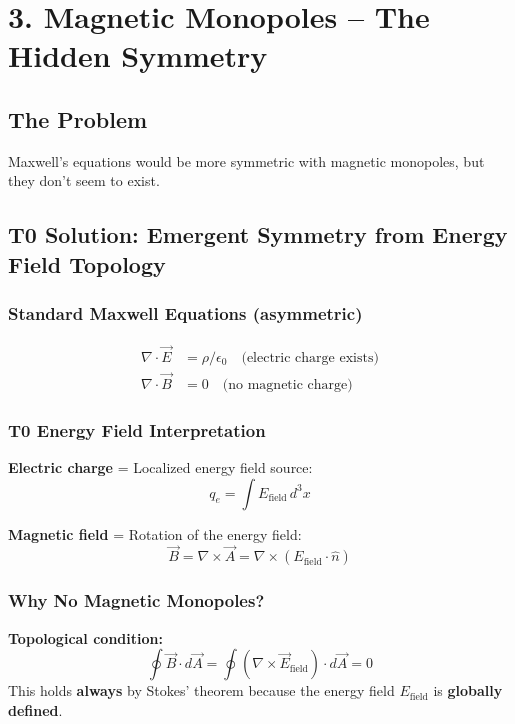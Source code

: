 	\section*{3. Magnetic Monopoles – The Hidden Symmetry}
	
	\subsection*{The Problem}
	Maxwell's equations would be more symmetric with magnetic monopoles, but they don't seem to exist.
	
	\subsection*{T0 Solution: Emergent Symmetry from Energy Field Topology}
	
	\subsubsection*{Standard Maxwell Equations (asymmetric)}
	\begin{align*}
		\nabla \cdot \vec{E} &= \rho/\epsilon_0 \quad \text{(electric charge exists)} \\
		\nabla \cdot \vec{B} &= 0 \quad \text{(no magnetic charge)}
	\end{align*}
	
	\subsubsection*{T0 Energy Field Interpretation}
	
	\textbf{Electric charge} = Localized energy field source:
	\[
	q_e = \int E_{\text{field}} \, d^3x
	\]
	
	\textbf{Magnetic field} = Rotation of the energy field:
	\[
	\vec{B} = \nabla \times \vec{A} = \nabla \times (E_{\text{field}} \cdot \hat{n})
	\]
	
	\subsubsection*{Why No Magnetic Monopoles?}
	
	\textbf{Topological condition:}
	\[
	\oint \vec{B} \cdot d\vec{A} = \oint (\nabla \times \vec{E}_{\text{field}}) \cdot d\vec{A} = 0
	\]
	This holds \textbf{always} by Stokes' theorem because the energy field $E_{\text{field}}$ is \textbf{globally defined}.
	
